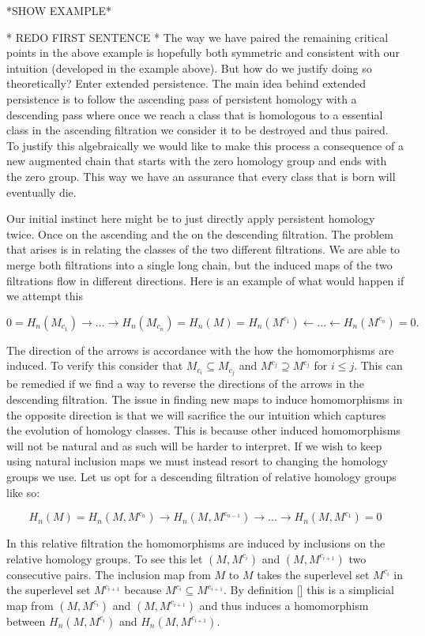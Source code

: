 *SHOW EXAMPLE*

* REDO FIRST SENTENCE *
The way we have paired the remaining critical points in the above example is hopefully both symmetric and consistent with our intuition (developed in the example above). But how do we justify doing so theoretically? Enter extended persistence. The main idea behind extended persistence is to follow the ascending pass of persistent homology with a descending pass where once we reach a class that is homologous to a essential class in the ascending filtration we consider it to be destroyed and thus paired. To justify this algebraically we would like to make this process a consequence of a new augmented chain that starts with the zero homology group and ends with the zero group. This way we have an assurance that every class that is born will eventually die.

Our initial instinct here might be to just directly apply persistent homology twice. Once on the ascending and the on the descending filtration. The problem that arises is in relating the classes of the two different filtrations. We are able to merge both filtrations into a single long chain, but the induced maps of the two filtrations flow in different directions. Here is an example of what would happen if we attempt this

$$ 0 = H_n(M_{c_1}) \rightarrow ... \rightarrow H_n(M_{c_n}) = H_n(M) = H_n(M^{c_1}) \leftarrow ... \leftarrow H_n(M^{c_{n}}) = 0.$$

The direction of the arrows is accordance with the how the homomorphisms are induced. To verify this consider that $M_{c_i} \subseteq M_{c_j}$ and $M^{c_j} \supseteq M^{c_j}$ for $i \le j$. This can be remedied if we find a way to reverse the directions of the arrows in the descending filtration. The issue in finding new maps to induce homomorphisms in the opposite direction is that we will sacrifice the our intuition which captures the evolution of homology classes. This is because other induced homomorphisms will not be natural and as such will be harder to interpret. If we wish to keep using natural inclusion maps we must instead resort to changing the homology groups we use. Let us opt for a descending filtration of relative homology groups like so:

$$ H_n(M) = H_n(M, M^{c_n}) \rightarrow H_n(M, M^{c_{n - 1}}) \rightarrow ... \rightarrow H_n(M, M^{c_{1}}) = 0 $$


In this relative filtration the homomorphisms are induced by inclusions on the relative homology groups. To see this let $(M, M^{c_i})$ and $(M, M^{c_{i+1}})$ two consecutive pairs. The inclusion map from $M$ to $M$ takes the superlevel set $M^{c_i}$ in the superlevel set $M^{c_{i+1}}$ because $M^{c_i} \subseteq M^{c_{i+1}}$. By definition [] this is a simplicial map from $(M, M^{c_i})$ and $(M, M^{c_{i+1}})$ and thus induces a homomorphism between $H_n(M, M^{c_i})$ and $H_n(M, M^{c_{i+1}})$.

